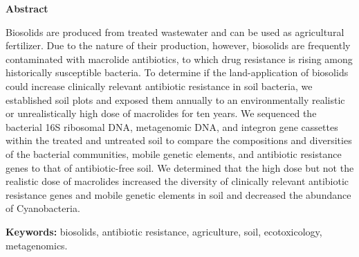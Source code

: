 \Large\begin{center}\textbf{Abstract}\end{center}\normalsize

\noindent
Biosolids are produced from treated wastewater and can be used as agricultural fertilizer. Due to the nature of their production, however, biosolids are frequently contaminated with macrolide antibiotics, to which drug resistance is rising among historically susceptible bacteria. To determine if the land-application of biosolids could increase clinically relevant antibiotic resistance in soil bacteria, we established soil plots and exposed them annually to an environmentally realistic or unrealistically high dose of macrolides for ten years. We sequenced the bacterial 16S ribosomal DNA, metagenomic DNA, and integron gene cassettes within the treated and untreated soil to compare the compositions and diversities of the bacterial communities, mobile genetic elements, and antibiotic resistance genes to that of antibiotic-free soil. We determined that the high dose but not the realistic dose of macrolides increased the diversity of clinically relevant antibiotic resistance genes and mobile genetic elements in soil and decreased the abundance of Cyanobacteria.

\vfill

\noindent\textbf{Keywords:} biosolids, antibiotic resistance, agriculture, soil, ecotoxicology, metagenomics.
